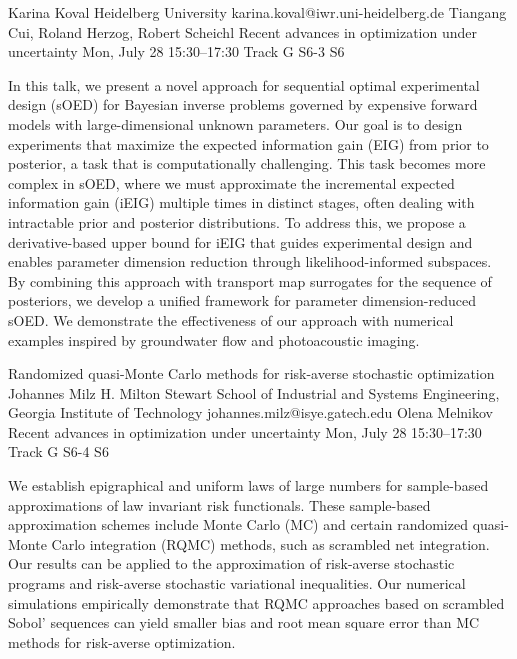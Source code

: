 \begin{talk}
  {Karina Koval}%
  {Heidelberg University}%
  {karina.koval@iwr.uni-heidelberg.de}%
  {Tiangang Cui, Roland Herzog, Robert Scheichl}%
  {Recent advances in optimization under uncertainty}%
  {}%
  {Mon, July 28 15:30–17:30 Track G}%
  {S6-3}%
  {S6}%
				
			
In this talk, we present a novel approach for sequential optimal experimental design (sOED) for Bayesian inverse problems governed by expensive forward models with large-dimensional unknown parameters. Our goal is to design experiments that maximize the expected information gain (EIG) from prior to posterior, a task that is computationally challenging. This task becomes more complex in sOED, where we must approximate the incremental expected information gain (iEIG) multiple times in distinct stages, often dealing with intractable prior and posterior distributions. To address this, we propose a derivative-based upper bound for iEIG that guides experimental design and enables parameter dimension reduction through likelihood-informed subspaces. By combining this approach with transport map surrogates for the sequence of posteriors, we develop a unified framework for parameter dimension-reduced sOED. We demonstrate the effectiveness of our approach with numerical examples inspired by groundwater flow and photoacoustic imaging.
\end{talk}

\begin{talk}
  {Randomized quasi-Monte Carlo methods for risk-averse stochastic optimization}%
  {Johannes Milz}%
  {H. Milton Stewart School of Industrial and Systems Engineering, Georgia Institute of Technology}%
  {johannes.milz@isye.gatech.edu}%
  {Olena Melnikov}%
  {Recent advances in optimization under uncertainty}%
  {Mon, July 28 15:30–17:30 Track G}%
  {S6-4}%
  {S6}%
				

We establish epigraphical and uniform laws of large numbers for sample-based approximations of law invariant risk functionals. These sample-based approximation schemes include Monte Carlo (MC) and certain randomized quasi-Monte Carlo integration (RQMC) methods, such as scrambled net integration. Our results can be applied to the approximation of risk-averse stochastic programs and risk-averse stochastic variational inequalities. Our numerical simulations empirically demonstrate that RQMC approaches based on scrambled Sobol' sequences can yield smaller bias and root mean square error than MC methods for risk-averse optimization.




\end{talk}

